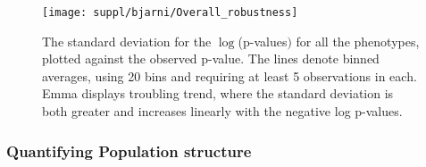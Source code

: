 \documentclass[10pt]{article}
\begin{document}
\begin{figure}
  \centering
  \texttt{[image: suppl/bjarni/Overall\_robustness]}
  \caption{The standard deviation for the $\log$(p-values$)$ for all the phenotypes, plotted against the observed p-value. The lines denote binned averages, using 20 bins and requiring at least 5 observations in each.  Emma displays troubling trend, where the standard deviation is both greater and increases linearly with the negative log p-values.  }
  \label{fig:rob_test}
\end{figure}




\subsubsection*{Quantifying Population structure}
\end{document}
